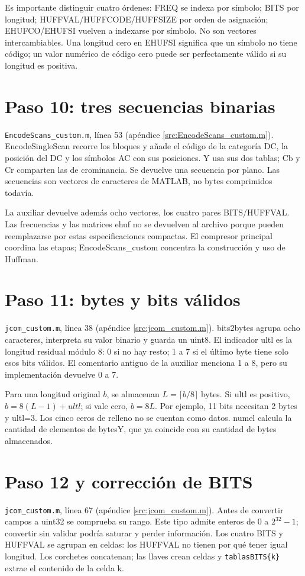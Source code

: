\documentclass[11pt,a4paper,oneside]{report}
\begin{document}
Es importante distinguir cuatro órdenes: FREQ se indexa por símbolo;
BITS por longitud; HUFFVAL/HUFFCODE/HUFFSIZE por orden de asignación;
EHUFCO/EHUFSI vuelven a indexarse por símbolo. No son vectores intercambiables.
Una longitud cero en EHUFSI significa que un símbolo no tiene código; un valor
numérico de código cero puede ser perfectamente válido si su longitud es positiva.


\section{Paso 10: tres secuencias binarias}
\texttt{EncodeScans\_custom.m}, línea 53 (apéndice \ref{src:EncodeScans_custom.m}).
EncodeSingleScan recorre los bloques y añade el código de la categoría DC,
la posición del DC y los símbolos AC con sus posiciones. Y usa sus dos tablas;
Cb y Cr comparten las de crominancia. Se devuelve una secuencia por plano.
Las secuencias son vectores de caracteres de MATLAB, no bytes comprimidos todavía.

La auxiliar devuelve además ocho vectores, los cuatro pares BITS/HUFFVAL.
Las frecuencias y las matrices ehuf no se devuelven al archivo porque pueden
reemplazarse por estas especificaciones compactas. El compresor principal
coordina las etapas; EncodeScans\_custom concentra la construcción y uso de Huffman.


\section{Paso 11: bytes y bits válidos}
\texttt{jcom\_custom.m}, línea 38 (apéndice \ref{src:jcom_custom.m}).
bits2bytes agrupa ocho caracteres, interpreta su valor binario y guarda un
uint8. El indicador ultl es la longitud residual módulo 8: 0 si no hay resto;
1 a 7 si el último byte tiene solo esos bits válidos. El comentario antiguo
de la auxiliar menciona 1 a 8, pero su implementación devuelve 0 a 7.

Para una longitud original $b$, se almacenan $L=\lceil b/8\rceil$ bytes.
Si ultl es positivo, $b=8(L-1)+ultl$; si vale cero, $b=8L$.
Por ejemplo, 11 bits necesitan 2 bytes y ultl=3. Los cinco ceros de relleno
no se cuentan como datos. numel calcula la cantidad de elementos de bytesY,
que ya coincide con su cantidad de bytes almacenados.


\section{Paso 12 y corrección de BITS}
\texttt{jcom\_custom.m}, línea 67 (apéndice \ref{src:jcom_custom.m}).
Antes de convertir campos a uint32 se comprueba su rango. Este tipo admite
enteros de 0 a $2^{32}-1$; convertir sin validar podría saturar y perder información.
Los cuatro BITS y HUFFVAL se agrupan en celdas: los HUFFVAL no tienen por qué
tener igual longitud. Los corchetes concatenan; las llaves crean celdas y
\texttt{tablasBITS\{k\}} extrae el contenido de la celda k.
\end{document}
